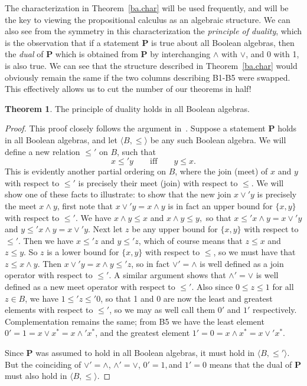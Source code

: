 \documentclass[11pt,titlepage]{article}
\newcommand{\spifff}{\qquad\text{iff}\qquad}
\theoremstyle{definition}
\newtheorem{theorem}[definition]{Theorem}
\begin{document}
The characterization in Theorem~\ref{ba.char} will be used frequently, and will be the key to viewing the propositional calculus as an algebraic structure. We can also see from the symmetry in this characterization the {\em principle of duality}, which is the observation that if a statement {\bf P} is true about all Boolean algebras, then the \emph{dual} of {\bf P} which is obtained from {\bf P} by interchanging $\land$ with $\lor$, and 0 with 1, is also true. We can see that the structure described in Theorem~\ref{ba.char} would obviously remain the same if the two columns describing B1-B5 were swapped. This effectively allows us to cut the number of our theorems in half!

\begin{theorem} The principle of duality holds in all Boolean algebras. \end{theorem}

\begin{proof} This proof closely follows the argument in~\cite{Bell}. Suppose a statement {\bf P} holds in all Boolean algebras, and let $\langle B, \leq \rangle$ be any such Boolean algebra. We will define a new relation $\leq'$ on $B$, such that $$x\leq' y\spifff y\leq x.$$ This is evidently another partial ordering on $B$, where the join (meet) of $x$ and $y$ with respect to $\leq'$ is precisely their meet (join) with respect to $\leq$. We will show one of these facts to illustrate: to show that the new join $x \lor' y$ is precisely the meet $x\land y$, first note that $x\lor' y=x\land y$ is in fact an upper bound for $\{x,y\}$ with respect to $\leq'$. We have $ x\land y\leq x$ and $ x\land y\leq y,$ so that $x\leq' x\land y=x\lor ' y$ and $y\leq ' x\land y=x\lor' y$. Next let $z$ be any upper bound for $\{x,y\}$ with respect to $\leq'$. Then we have $x\leq' z$ and $y\leq' z$, which of course means that $z\leq x$ and $z\leq y$. So $z$ is a lower bound for $\{x,y\}$ with respect to $\leq$, so we must have that $z\leq x\land y$. Then $x\lor'y=x\land y \leq' z$, so in fact $\lor' = \land$ is well defined as a join operator with respect to $\leq '$. A similar argument shows that $\land' = \lor$ is well defined as a new meet operator with respect to $\leq'$. Also since $0\leq z \leq 1$ for all $z\in B$, we have $1\leq' z\leq ' 0$, so that 1 and 0 are now the least and greatest elements with respect to $\leq'$, so we may as well call them $0'$ and $1'$ respectively. Complementation remains the same; from B5 we have the least element $0'=1 = x\lor x^* = x\land' x^*$, and the greatest element $1'=0=x\land x^*=x\lor' x^*$.

Since {\bf P} was assumed to hold in all Boolean algebras, it must hold in $\langle B, \leq' \rangle$. But the coinciding of $\lor' =\land$, $\land'=\lor$, $0'=1,$and $1'=0$ means that the dual of {\bf P} must also hold in $\langle B, \leq \rangle$.
\end{proof}
\end{document}
